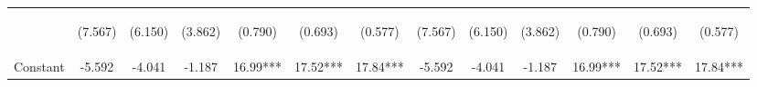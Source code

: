 \documentclass[]{article}
\begin{document}
\begin{center}
\begin{tabular}{lcccccccccccc}
\vspace{4pt} & \begin{footnotesize}(7.567)\end{footnotesize} & \begin{footnotesize}(6.150)\end{footnotesize} & \begin{footnotesize}(3.862)\end{footnotesize} & \begin{footnotesize}(0.790)\end{footnotesize} & \begin{footnotesize}(0.693)\end{footnotesize} & \begin{footnotesize}(0.577)\end{footnotesize} & \begin{footnotesize}(7.567)\end{footnotesize} & \begin{footnotesize}(6.150)\end{footnotesize} & \begin{footnotesize}(3.862)\end{footnotesize} & \begin{footnotesize}(0.790)\end{footnotesize} & \begin{footnotesize}(0.693)\end{footnotesize} & \begin{footnotesize}(0.577)\end{footnotesize} \\
Constant & -5.592 & -4.041 & -1.187 & 16.99*** & 17.52*** & 17.84*** & -5.592 & -4.041 & -1.187 & 16.99*** & 17.52*** & 17.84*** \\

\end{tabular}
\end{center}
\end{document}
